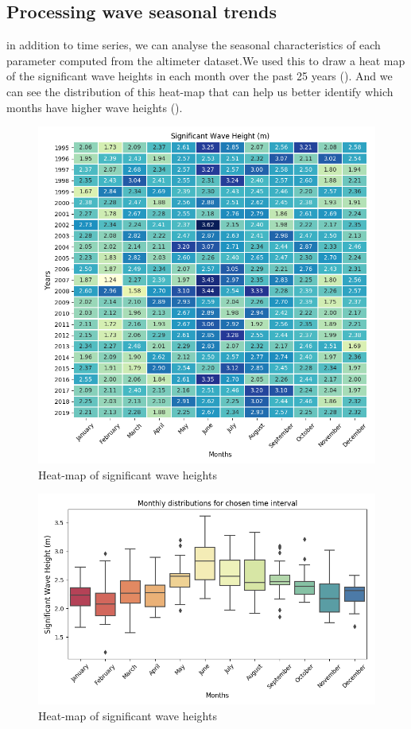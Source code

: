 \documentclass[12pt]{article}
\begin{document}

\newpage

\subsection{Processing wave seasonal trends}
in addition to time series, we can analyse the seasonal characteristics of each parameter computed from the altimeter dataset.We used this to draw a heat map of the significant wave heights in each month over the past 25 years (). And we can see the distribution of this heat-map that can help us better identify which months have higher wave heights (). 

\begin{figure}[h]
    \centering
    \includegraphics[width=10 cm]{whall_wh_heatmap.png}
    \caption{Heat-map of significant wave heights}
    \label{fig:fig5}
\end{figure}

\begin{figure}[h]
    \centering
    \includegraphics[width=6.5 cm]{whall_wh_distribution.png}
    \caption{Heat-map of significant wave heights}
    \label{fig:fig6}
\end{figure}
\end{document}
